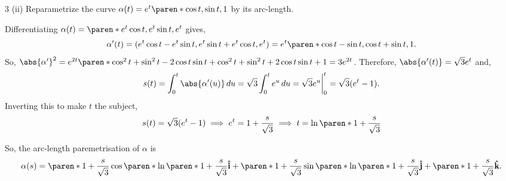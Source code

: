 \documentclass[11pt]{penrose}
\begin{document}
\begin{problem}{3 (ii)}
    Reparametrize the curve $\alpha(t) = e^{t}\paren*{\cos t, \sin t, 1}$ by its arc-length.

    \solution Differentiating $\alpha(t) = \paren*{e^t \cos t, e^t \sin t, e^t}$ gives,
    \begin{equation*}
        \alpha'(t) = (e^t \cos t - e^t \sin t, e^t \sin t + e^t \cos t, e^t) = e^t \paren*{\cos t - \sin t, \cos t + \sin t, 1}.
    \end{equation*}
    So, $\abs{\alpha'}^2 = e^{2t} \paren*{\cos^2 t + \sin^2 t - 2\cos t \sin t + \cos^2 t + \sin^2 t + 2\cos t \sin t + 1} = 3 e^{2t}$. Therefore, $\abs{\alpha'(t)} = \sqrt{3} e^t$ and,
    \begin{equation*}
        s(t)
        = \int_0^t \abs{\alpha'(u)} \,du
        = \sqrt{3} \int_0^t e^u \,du
        = \sqrt{3} e^u \bigg|_0^t
        = \sqrt{3} (e^t - 1).
    \end{equation*}
    Inverting this to make $t$ the subject,
    \begin{equation*}
        s(t) = \sqrt{3} (e^t - 1)
        \implies
        e^t = 1 + \frac{s}{\sqrt{3}}
        \implies
        t = \ln \paren*{1 + \frac{s}{\sqrt{3}}}
    \end{equation*}

    So, the arc-length paremetrisation of $\alpha$ is
    \begin{equation*}
        \alpha(s) = \paren*{1 + \frac{s}{\sqrt{3}}}\cos \paren*{\ln \paren*{1 + \frac{s}{\sqrt{3}}}} \uvec{i} + \paren*{1 + \frac{s}{\sqrt{3}}}\sin \paren*{\ln \paren*{1 + \frac{s}{\sqrt{3}}}} \uvec{j} + \paren*{1 + \frac{s}{\sqrt{3}}} \uvec{k}.
    \end{equation*}
\end{problem}
\end{document}
